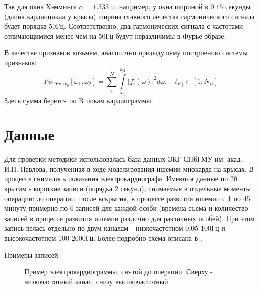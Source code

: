 \documentclass[a4paper,12pt]{extarticle}
\begin{document}
Так для окна Хэмминга $\alpha=1.333$ и, например, у окна шириной в $0.15$ секунды (длина кардиоцикла у крысы\cite{BioModel2004}) ширина главного лепестка гармонического сигнала будет порядка $50$Гц. Соответственно, два гармонических сигнала с частотами отличающимися менее чем на 50Гц будут неразличимы в Фурье-образе. 

В качестве признаков возьмем, аналогично предыдущему построению системы признаков:
$$ Fw_{\Delta w, w_0}[\omega_1,\omega_2] = \sum_i^N \int\limits_{\omega_1}^{\omega_2} |f_i(\omega)|^2 d\omega ,\quad {t_R}_i \in [1;N_R] $$
Здесь сумма берется по R пикам кардиограммы.

\section{Данные}

Для проверки методики использовалась база данных ЭКГ СПбГМУ им. акад. И.П. Павлова\cite{EIoA_GZ13}, полученная в ходе моделирования ишемии миокарда на крысах. В процессе снимались показания электрокардиографа. Имеются данные по 20 крысам - короткие записи (порядка 2 секунд), снимаемые в отдельные моменты операции: до операции, после вскрытия, в процессе развития ишемии с 1 по 45 минуту примерно по 6 записей для каждой особи (времена съема и количество записей в процессе развития ишемии различно для различных особей). При этом запись велась отдельно по двум каналам - низкочастотном 0.05-100Гц и высокочастотном 100-2000Гц. Более подробно схема описана в \cite{AnalogProcess_Z2009}.

\vspace{0.3cm}

Примеры записей:
\begin{figure}[H]
    \noindent{}
    \caption{Пример электрокардиограммы, снятой до операции. Сверху - низкочастотный канал, снизу высокочастотный}
\end{figure}
\end{document}
